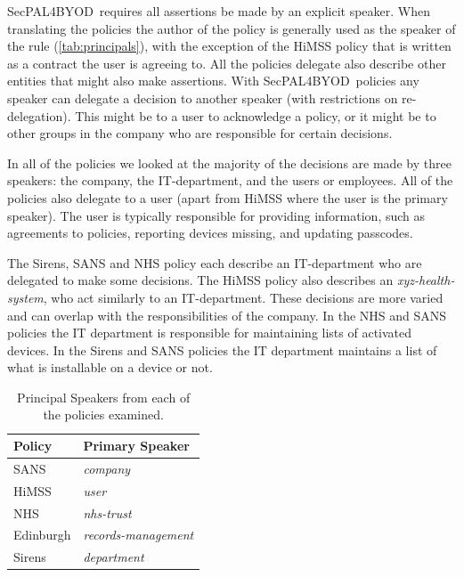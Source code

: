 \documentclass{llncs}
\newcommand{\AppPAL}[0]{SecPAL4BYOD}
\begin{document}
\AppPAL~requires all assertions be made by an explicit speaker.
When translating the policies the author of the policy is generally used as the speaker of the rule (\autoref{tab:principals}),
  with the exception of the HiMSS policy that is written as a contract the user is agreeing to.
All the policies delegate also describe other entities that might also make assertions.
With \AppPAL~policies any speaker can delegate a decision to another speaker (with restrictions on re-delegation).
This might be to a user to acknowledge a policy, or it might be to other groups in the company who are responsible for certain decisions.

In all of the policies we looked at the majority of the decisions are made by three speakers: 
  the company, the IT-department, and the users or employees.
All of the policies also delegate to a user (apart from HiMSS where the user is the primary speaker).
The user is typically responsible for providing information, such as agreements to policies, reporting devices missing, and updating passcodes.

The Sirens, SANS and NHS policy each describe an IT-department who are delegated to make some decisions.
The HiMSS policy also describes an \emph{xyz-health-system}, who act similarly to an IT-department.
These decisions are more varied and can overlap with the responsibilities of the company.
In the NHS and SANS policies the IT department is responsible for maintaining lists of activated devices.
In the Sirens and SANS policies the IT department maintains a list of what is installable on a device or not.

\begin{table}\centering\footnotesize
  \begin{tabular}{l l}
    \toprule
    Policy      & Primary Speaker           \\
    \midrule
    {SANS}      & \emph{company}            \\
    {HiMSS}     & \emph{user}               \\
    {NHS}       & \emph{nhs-trust}          \\
    {Edinburgh} & \emph{records-management} \\
    {Sirens}    & \emph{department}         \\
    \bottomrule
  \end{tabular}
  \label{tab:principals}
  \caption{Principal Speakers from each of the policies examined.}
\end{table}
\end{document}
